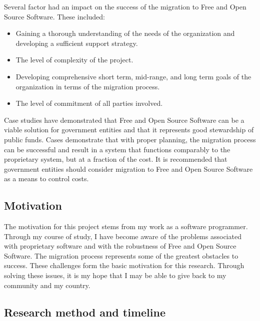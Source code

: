   Several factor had an impact on the success of the migration to Free and Open Source Software. These included: 
  \begin{itemize} [itemsep=0ex]
  \item Gaining a thorough understanding of the needs of the organization and developing 	a sufficient support strategy.
  \item The level of complexity of the project.
  \item Developing comprehensive short term, mid-range, and long term goals of the organization in terms of the migration process.
  \item The level of commitment of all parties involved.
  \end{itemize}
 
  Case studies have demonstrated that Free and Open Source Software can be a viable solution for government entities and that it represents good stewardship of public funds. Cases demonstrate that with proper planning, the migration process can be successful and result in a system that functions comparably to the proprietary system, but at a fraction of the cost. It is recommended that government entities should consider migration to Free and Open Source Software as a means to control costs. 

  \subsection{Motivation}

  The motivation for this project stems from my work as a software programmer. Through my course of study, I have become aware of the problems associated with proprietary software and with the robustness of Free and Open Source Software. The migration process represents some of the greatest obstacles to success. These challenges form the basic motivation for this research. Through solving these issues, it is my hope that I may be able to give back to my community and my country. 



  \subsection{Research method and timeline}

